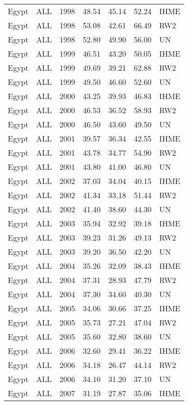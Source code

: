 \begin{longtable}{lllrrrl}
  Egypt & ALL & 1998 & 48.54 & 45.14 & 52.24 & IHME \\ 
  Egypt & ALL & 1998 & 53.08 & 42.61 & 66.49 & RW2 \\ 
  Egypt & ALL & 1998 & 52.80 & 49.90 & 56.00 & UN \\ 
  Egypt & ALL & 1999 & 46.51 & 43.20 & 50.05 & IHME \\ 
  Egypt & ALL & 1999 & 49.69 & 39.21 & 62.88 & RW2 \\ 
  Egypt & ALL & 1999 & 49.50 & 46.60 & 52.60 & UN \\ 
  Egypt & ALL & 2000 & 43.25 & 39.93 & 46.83 & IHME \\ 
  Egypt & ALL & 2000 & 46.53 & 36.52 & 58.93 & RW2 \\ 
  Egypt & ALL & 2000 & 46.50 & 43.60 & 49.50 & UN \\ 
  Egypt & ALL & 2001 & 39.57 & 36.34 & 42.55 & IHME \\ 
  Egypt & ALL & 2001 & 43.78 & 34.77 & 54.90 & RW2 \\ 
  Egypt & ALL & 2001 & 43.80 & 41.00 & 46.80 & UN \\ 
  Egypt & ALL & 2002 & 37.03 & 34.04 & 40.15 & IHME \\ 
  Egypt & ALL & 2002 & 41.34 & 33.18 & 51.44 & RW2 \\ 
  Egypt & ALL & 2002 & 41.40 & 38.60 & 44.30 & UN \\ 
  Egypt & ALL & 2003 & 35.94 & 32.92 & 39.18 & IHME \\ 
  Egypt & ALL & 2003 & 39.23 & 31.26 & 49.13 & RW2 \\ 
  Egypt & ALL & 2003 & 39.20 & 36.50 & 42.20 & UN \\ 
  Egypt & ALL & 2004 & 35.26 & 32.09 & 38.43 & IHME \\ 
  Egypt & ALL & 2004 & 37.31 & 28.93 & 47.79 & RW2 \\ 
  Egypt & ALL & 2004 & 37.30 & 34.60 & 40.30 & UN \\ 
  Egypt & ALL & 2005 & 34.06 & 30.66 & 37.25 & IHME \\ 
  Egypt & ALL & 2005 & 35.73 & 27.21 & 47.04 & RW2 \\ 
  Egypt & ALL & 2005 & 35.60 & 32.80 & 38.60 & UN \\ 
  Egypt & ALL & 2006 & 32.60 & 29.41 & 36.22 & IHME \\ 
  Egypt & ALL & 2006 & 34.18 & 26.47 & 44.14 & RW2 \\ 
  Egypt & ALL & 2006 & 34.10 & 31.20 & 37.10 & UN \\ 
  Egypt & ALL & 2007 & 31.19 & 27.87 & 35.06 & IHME \\ 

\end{longtable}
